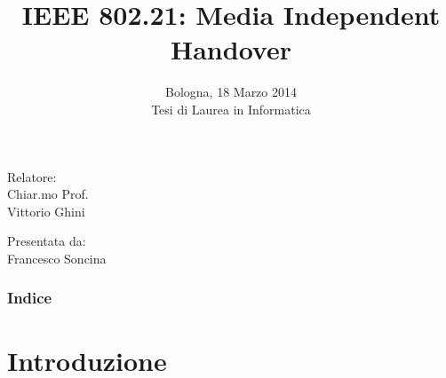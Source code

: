 \documentclass[10pt]{beamer}
\title[IEEE 802.21]{IEEE 802.21: Media Independent Handover} %

{
}
\date{Bologna, 18 Marzo 2014\\\vspace{1.5em}Tesi di Laurea in Informatica}
\begin{document}
\begin{frame}
\titlepage %
\begin{minipage}[t]{0.47\textwidth}
Relatore:\\
Chiar.mo Prof.\\
Vittorio Ghini
\end{minipage}
\hfill
\begin{minipage}[t]{0.47\textwidth}\raggedleft
Presentata da:\\
Francesco Soncina
\end{minipage}
\end{frame}

\begin{frame}
\frametitle{Indice} %
\tableofcontents %
\end{frame}


\section{Introduzione} %
\end{document}
